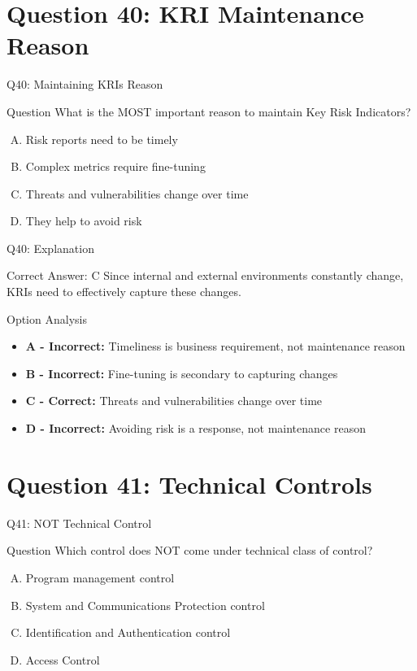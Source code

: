 \documentclass{beamer}
\begin{document}
	\section{Question 40: KRI Maintenance Reason}
	
	\begin{frame}{Q40: Maintaining KRIs Reason}
		\begin{block}{Question}
			What is the MOST important reason to maintain Key Risk Indicators?
		\end{block}
		\begin{enumerate}[(A)]
			\item Risk reports need to be timely
			\item Complex metrics require fine-tuning
			\item Threats and vulnerabilities change over time
			\item They help to avoid risk
		\end{enumerate}
	\end{frame}
	
	\begin{frame}{Q40: Explanation}
		\begin{block}{Correct Answer: C}
			Since internal and external environments constantly change, KRIs need to effectively capture these changes.
		\end{block}
		\begin{block}{Option Analysis}
			\begin{itemize}
				\item \textbf{A - Incorrect:} Timeliness is business requirement, not maintenance reason
				\item \textbf{B - Incorrect:} Fine-tuning is secondary to capturing changes
				\item \textbf{C - Correct:} Threats and vulnerabilities change over time
				\item \textbf{D - Incorrect:} Avoiding risk is a response, not maintenance reason
			\end{itemize}
		\end{block}
	\end{frame}
	
	\section{Question 41: Technical Controls}
	
	\begin{frame}{Q41: NOT Technical Control}
		\begin{block}{Question}
			Which control does NOT come under technical class of control?
		\end{block}
		\begin{enumerate}[(A)]
			\item Program management control
			\item System and Communications Protection control
			\item Identification and Authentication control
			\item Access Control
		\end{enumerate}
	\end{frame}
	
\end{document}
